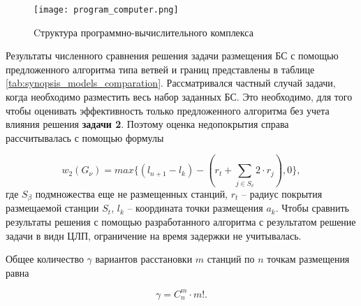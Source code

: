 

\begin{figure}[h!]
    \centering
     \texttt{[image: program\_computer.png]}
  \caption{Cтруктура программно-вычислительного комплекса}
  \label{fig:synopsis_program_computer}
  \end{figure}

Результаты численного сравнения решения задачи размещения БС с помощью предложенного алгоритма  типа ветвей и границ представлены в таблице \cref{tab:synopsis_models_comparation}. Рассматривался частный случай задачи, когда необходимо разместить весь набор заданных БС. Это необходимо, для того чтобы оценивать эффективность только предложенного алгоритма без учета влияния решения \textbf{задачи 2}. Поэтому оценка недопокрытия справа рассчитывалась с помощью формулы

\begin{displaymath}
w_2 \left(G_\nu \right) = max\{\left(l_{n+1}-l_k\right)-(r_t+\sum_{j\in S_v}{2 \cdot r_j}),0\},
\end{displaymath}
где $S_\beta$ подмножества еще не размещенных станций, $r_t$ -- радиус покрытия размещаемой станции $S_t$, $l_k$ -- координата точки размещения $a_k$. Чтобы сравнить результаты решения с помощью разработанного алгоритма с результатом решение задачи в видн ЦЛП, ограничение на время задержки не учитывалась.

Общее количество $\gamma$ вариантов расстановки $m$ станций по $n$ точкам размещения равна 

\begin{equation}
  \label{eq:synopsis_gamma}
  \gamma = C^m_n \cdot m! .
\end{equation}

